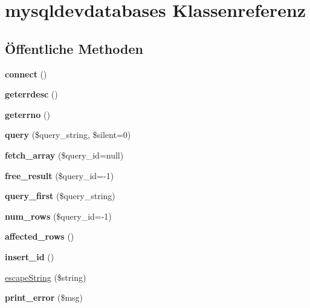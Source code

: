 \hypertarget{classmysqldevdatabases}{}\section{mysqldevdatabases Klassenreferenz}
\label{classmysqldevdatabases}
\subsection*{Öffentliche Methoden}
\begin{DoxyCompactItemize}
\item 
\mbox{\label{classmysqldevdatabases_a40d6083a43dfc4ca0a579142f1abbed6}} 
{\bfseries connect} ()
\item 
\mbox{\label{classmysqldevdatabases_aed7fbeb49ef0862f78617c55ab4afe48}} 
{\bfseries geterrdesc} ()
\item 
\mbox{\label{classmysqldevdatabases_add1897236b21e19b2cfea0caea2c9d22}} 
{\bfseries geterrno} ()
\item 
\mbox{\label{classmysqldevdatabases_ac4de84c35757458e976e566ace92ab13}} 
{\bfseries query} (\$query\+\_\+string, \$silent=0)
\item 
\mbox{\label{classmysqldevdatabases_a7f8fc36f5b870e171c484e82252166dc}} 
{\bfseries fetch\+\_\+array} (\$query\+\_\+id=null)
\item 
\mbox{\label{classmysqldevdatabases_a4e2cc078defc8e88f8eba2594bf9ab7a}} 
{\bfseries free\+\_\+result} (\$query\+\_\+id=-\/1)
\item 
\mbox{\label{classmysqldevdatabases_a68b745fcff225f927ad8633afc7b2898}} 
{\bfseries query\+\_\+first} (\$query\+\_\+string)
\item 
\mbox{\label{classmysqldevdatabases_aba52a0d8f38b30d4a76bc2589c34a91e}} 
{\bfseries num\+\_\+rows} (\$query\+\_\+id=-\/1)
\item 
\mbox{\label{classmysqldevdatabases_aeffbfc0db4327864ddc2f15b0b6899ab}} 
{\bfseries affected\+\_\+rows} ()
\item 
\mbox{\label{classmysqldevdatabases_ac07c62827445cfff71419a15330a5876}} 
{\bfseries insert\+\_\+id} ()
\item 
\mbox{\hyperlink{classmysqldevdatabases_a2586a7e38266035410c83c0e7b801d8c}{escape\+String}} (\$string)
\item 
\mbox{\label{classmysqldevdatabases_a2d4464928fc68c96a5efbdd0e5b8cd70}} 
{\bfseries print\+\_\+error} (\$msg)
\end{DoxyCompactItemize}


